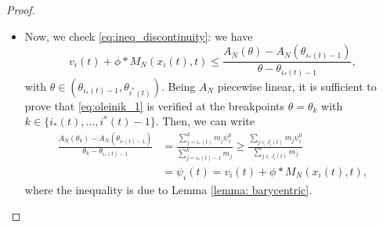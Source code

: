 \documentclass[11pt,a4paper,oneside]{amsart}
\begin{document}
\begin{proof}
\begin{itemize}
\begin{align*}
         &\frac{A_N\circ M_N(x_i(t)+,t)-A_N\circ M_N(x_i(t)-,t)}{M_N(x_i(t)+,t)-M_N(x_i(t)-,t)}=\frac{\sum_{j\in J_i(t)}m_j\psi_j^0}{\sum_{j\in J_i(t)}m_j}\\
         &=\psi_i(t)
         =v_i(t)+\sum_{j=1}^Nm_j\omega(x_i(t)-x_j(t))       
         \\&=v_i(t)+\phi\ast M_N(x_i(t),t),
    \end{align*}
    then the Rankine-Hugoniot condition %
    is proved. 
    \item[\textbf{(d)}] 
    Now, we check \eqref{eq:ineq_discontinuity}: we have 
    \begin{equation}\label{eq:oleinik_1}
        v_i(t)+\phi\ast M_N(x_i(t),t)\leq\frac{A_N(\theta)-A_N(\theta_{i_*(t)-1})}{\theta-\theta_{i_*(t)-1}},
    \end{equation}
    with $\theta\in(\theta_{i_*(t)-1},\theta_{i^*(t)})$.
    Being $A_N$ piecewise linear, it is sufficient to prove that \eqref{eq:oleinik_1} is verified at the breakpoints $\theta=\theta_k$ with $k\in\{i_*(t),\dots,i^*(t)-1\}$. Then, we can write 
    \begin{align*}
        \frac{A_N(\theta_k)-A_N(\theta_{i_*(t)-1})}{\theta_k-\theta_{i_*(t)-1}}&
        =\frac{\sum_{j=i_*(t)}^k m_j\psi_i^0}{\sum_{j=i_*(t)-1}^k m_j}\geq\frac{\sum_{j\in J_i(t)}m_j\psi_i^0}{\sum_{j\in J_i(t)} m_j}
        \\&=\psi_i(t)=v_i(t)+\phi\ast M_N(x_i(t),t),
    \end{align*}
    where the inequality is due to Lemma \ref{lemma: barycentric}.
    \end{itemize}
\end{proof}
\end{document}
